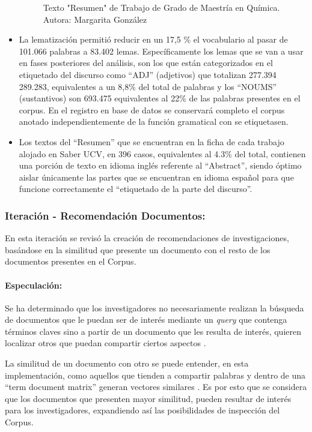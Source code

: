 \documentclass[
  12pt,
  openany]{book}
\begin{document}
\begin{itemize}
\begin{figure}
  \caption{Texto "Resumen" de Trabajo de Grado de Maestría en Química. Autora: Margarita González}\label{fig:quimica}
  \end{figure}
\item
  La lematización permitió reducir en un 17,5 \% el vocabulario al pasar de 101.066 palabras a 83.402 lemas. Específicamente los lemas que se van a usar en fases posteriores del análisis, son los que están categorizados en el etiquetado del discurso como ``ADJ'' (adjetivos) que totalizan 277.394 289.283, equivalentes a un 8,8\% del total de palabras y los ``NOUMS'' (sustantivos) son 693.475 equivalentes al 22\% de las palabras presentes en el corpus. En el registro en base de datos se conservará completo el corpus anotado independientemente de la función gramatical con se etiquetasen.
\item
  Los textos del ``Resumen'' que se encuentran en la ficha de cada trabajo alojado en Saber UCV, en 396 casos, equivalentes al 4.3\% del total, contienen una porción de texto en idioma inglés referente al ``Abstract'', siendo óptimo aislar únicamente las partes que se encuentran en idioma español para que funcione correctamente el ``etiquetado de la parte del discurso''.
\end{itemize}

\hypertarget{imrecomendacion}{%
\subsubsection{Iteración - Recomendación Documentos:}\label{imrecomendacion}}

En esta iteración se revisó la creación de recomendaciones de investigaciones, basándose en la similitud que presente un documento con el resto de los documentos presentes en el Corpus.

\hypertarget{especulaciuxf3n-5}{%
\paragraph{Especulación:}\label{especulaciuxf3n-5}}

Se ha determinado que los investigadores no necesariamente realizan la búsqueda de documentos que le puedan ser de interés mediante un \emph{query} que contenga términos claves sino a partir de un documento que les resulta de interés, quieren localizar otros que puedan compartir ciertos aspectos \citep{zhou2018}.

La similitud de un documento con otro se puede entender, en esta implementación, como aquellos que tienden a compartir palabras y dentro de una ``term document matrix'' generan vectores similares \citep{jurafsky2009}. Es por esto que se considera que los documentos que presenten mayor similitud, pueden resultar de interés para los investigadores, expandiendo así las posibilidades de inspección del Corpus.
\end{document}
